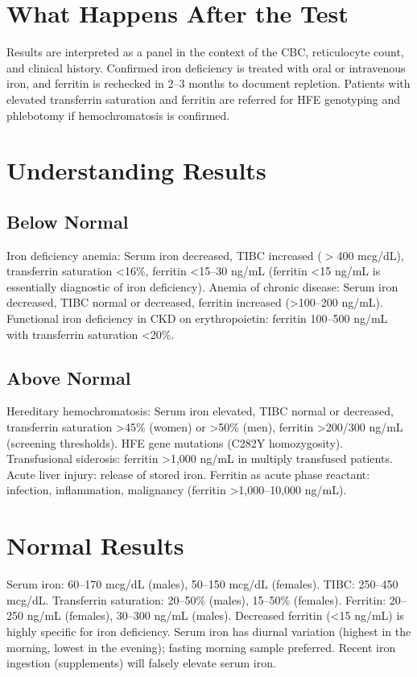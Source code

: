 \section*{What Happens After the Test}
Results are interpreted as a panel in the context of the CBC, reticulocyte count, and clinical history. Confirmed iron deficiency is treated with oral or intravenous iron, and ferritin is rechecked in 2--3 months to document repletion. Patients with elevated transferrin saturation and ferritin are referred for HFE genotyping and phlebotomy if hemochromatosis is confirmed.
\section*{Understanding Results}
\subsection*{Below Normal}
Iron deficiency anemia: Serum iron decreased, TIBC increased ($>$400 mcg/dL), transferrin saturation <16\%, ferritin <15--30 ng/mL (ferritin <15 ng/mL is essentially diagnostic of iron deficiency). Anemia of chronic disease: Serum iron decreased, TIBC normal or decreased, ferritin increased (>100--200 ng/mL). Functional iron deficiency in CKD on erythropoietin: ferritin 100--500 ng/mL with transferrin saturation <20\%.
\subsection*{Above Normal}
Hereditary hemochromatosis: Serum iron elevated, TIBC normal or decreased, transferrin saturation >45\% (women) or >50\% (men), ferritin >200/300 ng/mL (screening thresholds). HFE gene mutations (C282Y homozygosity). Transfusional siderosis: ferritin >1,000 ng/mL in multiply transfused patients. Acute liver injury: release of stored iron. Ferritin as acute phase reactant: infection, inflammation, malignancy (ferritin >1,000--10,000 ng/mL).
\section*{Normal Results}
Serum iron: 60--170 mcg/dL (males), 50--150 mcg/dL (females). TIBC: 250--450 mcg/dL. Transferrin saturation: 20--50\% (males), 15--50\% (females). Ferritin: 20--250 ng/mL (females), 30--300 ng/mL (males). Decreased ferritin (<15 ng/mL) is highly specific for iron deficiency. Serum iron has diurnal variation (highest in the morning, lowest in the evening); fasting morning sample preferred. Recent iron ingestion (supplements) will falsely elevate serum iron.
